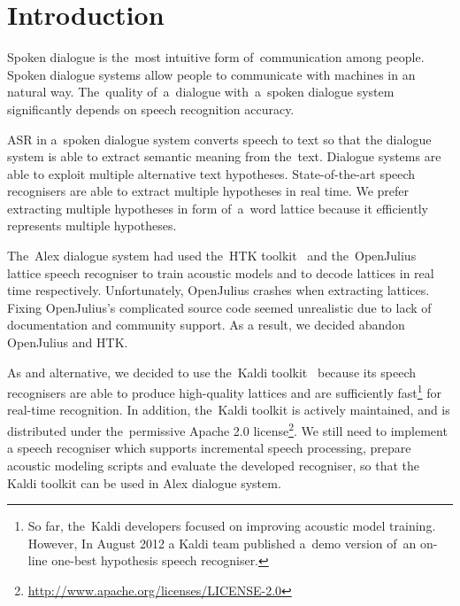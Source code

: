 \chapter{Introduction}
\label{cha:intro}

Spoken dialogue is the~most intuitive form of~communication among people. 
Spoken dialogue systems allow people to communicate with machines in an natural way.
The~quality of~a~dialogue with~a~spoken dialogue system significantly depends on speech recognition accuracy. 


\acf{ASR} in a~spoken dialogue system converts speech to text so that the dialogue system is able to extract semantic meaning from the~text.
Dialogue systems are able to exploit multiple alternative text hypotheses.
State-of-the-art speech recognisers are able to extract multiple hypotheses in real time.
We prefer extracting multiple hypotheses in form of~a~word lattice because it efficiently represents multiple hypotheses.

The~Alex dialogue system had used the~\ac{HTK} toolkit~\cite{young94htk} and the~OpenJulius~\cite{lee2009julius} lattice speech recogniser to train acoustic models and to decode lattices in real time respectively. 
Unfortunately, OpenJulius crashes when extracting lattices.
Fixing OpenJulius's complicated source code seemed unrealistic due to lack of documentation and community support.
As a result, we decided abandon OpenJulius and \ac{HTK}.

As and alternative, we decided to use the~Kaldi toolkit~\cite{povey2011kaldi} because its speech recognisers are able to produce high-quality lattices and are sufficiently fast\footnote{So far, 
    the~Kaldi developers focused on improving acoustic model training. 
    However, In August 2012 a Kaldi team published a~demo version of~an on-line one-best hypothesis speech recogniser.} 
for real-time recognition.\cite{povey2012generating}
In addition, the~Kaldi toolkit is actively maintained, and is distributed under the~permissive Apache 2.0 license\footnote{\url{http://www.apache.org/licenses/LICENSE-2.0}}.
We still need to implement a speech recogniser which supports incremental speech processing, prepare acoustic modeling scripts and evaluate the developed recogniser, so that the Kaldi toolkit can be used in Alex dialogue system.


